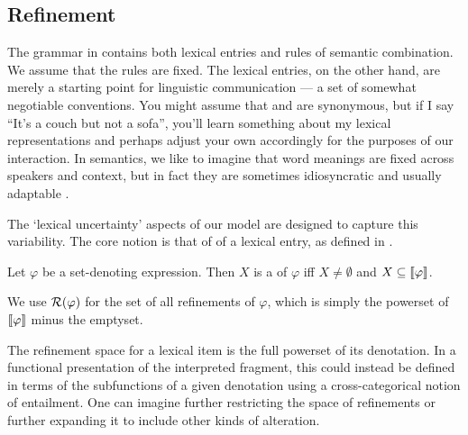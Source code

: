 \documentclass[leqno]{article}
\begin{document}

\subsection{Refinement}\label{sec:refine}

The grammar in  contains both lexical entries and
rules of semantic combination. We assume that the rules are fixed.
The lexical entries, on the other hand, are merely a starting point
for linguistic communication --- a set of somewhat negotiable
conventions. You might assume that  and  are
synonymous, but if I say ``It's a couch but not a sofa'', you'll learn
something about my lexical representations and perhaps adjust your own
accordingly for the purposes of our interaction. In semantics, we like
to imagine that word meanings are fixed across speakers and context,
but in fact they are sometimes idiosyncratic and usually adaptable
\citep{Clark97}. 

The `lexical uncertainty' aspects of our model are designed to capture
this variability. The core notion is that of  of a
lexical entry, as defined in .
%
\begin{examples}
\item\label{refinement} 
  \begin{examples}
  \item Let $\varphi$ be a set-denoting expression. Then $X$ is a
     of $\varphi$ iff $X \neq \emptyset$ and $X
    \subseteq \llbracket\varphi\rrbracket$.

  \item We use $\mathcal{R}(\varphi)$ for the set of all refinements of
    $\varphi$, which is simply the powerset of $\llbracket\varphi\rrbracket$ minus
    the emptyset.
  \end{examples}
\end{examples}
%
The refinement space for a lexical item is the full powerset of its
denotation. In a functional presentation of the interpreted fragment,
this could instead be defined in terms of the subfunctions of a given
denotation using a cross-categorical notion of entailment. One can
imagine further restricting the space of refinements or further
expanding it to include other kinds of alteration.
\end{document}
